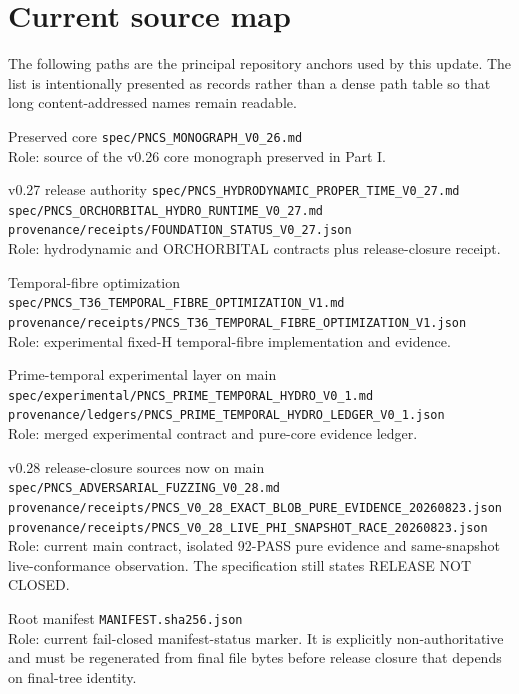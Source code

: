 \chapter{Current source map}

The following paths are the principal repository anchors used by this update. The list is intentionally presented as records rather than a dense path table so that long content-addressed names remain readable.

\begin{statusbox}{Preserved core}
\texttt{spec/PNCS\_MONOGRAPH\_V0\_26.md}\\
Role: source of the v0.26 core monograph preserved in Part I.
\end{statusbox}

\begin{statusbox}{v0.27 release authority}
\texttt{spec/PNCS\_HYDRODYNAMIC\_PROPER\_TIME\_V0\_27.md}\\
\texttt{spec/PNCS\_ORCHORBITAL\_HYDRO\_RUNTIME\_V0\_27.md}\\
\texttt{provenance/receipts/FOUNDATION\_STATUS\_V0\_27.json}\\
Role: hydrodynamic and ORCHORBITAL contracts plus release-closure receipt.
\end{statusbox}

\begin{statusbox}{Temporal-fibre optimization}
\texttt{spec/PNCS\_T36\_TEMPORAL\_FIBRE\_OPTIMIZATION\_V1.md}\\
\texttt{provenance/receipts/PNCS\_T36\_TEMPORAL\_FIBRE\_OPTIMIZATION\_V1.json}\\
Role: experimental fixed-H temporal-fibre implementation and evidence.
\end{statusbox}

\begin{statusbox}{Prime-temporal experimental layer on main}
\texttt{spec/experimental/PNCS\_PRIME\_TEMPORAL\_HYDRO\_V0\_1.md}\\
\texttt{provenance/ledgers/PNCS\_PRIME\_TEMPORAL\_HYDRO\_LEDGER\_V0\_1.json}\\
Role: merged experimental contract and pure-core evidence ledger.
\end{statusbox}

\begin{statusbox}{v0.28 release-closure sources now on main}
\texttt{spec/PNCS\_ADVERSARIAL\_FUZZING\_V0\_28.md}\\
\texttt{provenance/receipts/PNCS\_V0\_28\_EXACT\_BLOB\_PURE\_EVIDENCE\_20260823.json}\\
\texttt{provenance/receipts/PNCS\_V0\_28\_LIVE\_PHI\_SNAPSHOT\_RACE\_20260823.json}\\
Role: current main contract, isolated 92-PASS pure evidence and same-snapshot live-conformance observation. The specification still states RELEASE NOT CLOSED.
\end{statusbox}

\begin{statusbox}{Root manifest}
\texttt{MANIFEST.sha256.json}\\
Role: current fail-closed manifest-status marker. It is explicitly non-authoritative and must be regenerated from final file bytes before release closure that depends on final-tree identity.
\end{statusbox}
